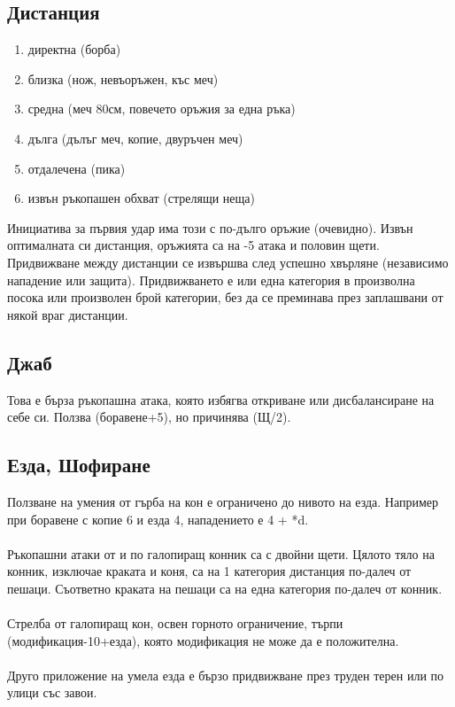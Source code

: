 \begin{footnotesize}
\subsection{Дистанция}
\begin{enumerate}
\item{директна (борба)}
\item{близка (нож, невъоръжен, къс меч)}
\item{средна (меч 80см, повечето оръжия за една ръка)}
\item{дълга (дълъг меч, копие, двуръчен меч)}
\item{отдалечена (пика)}
\item{извън ръкопашен обхват (стрелящи неща)}
\end{enumerate}
Инициатива за първия удар има този с по-дълго оръжие (очевидно).
Извън оптималната си дистанция, оръжията са на -5 атака и половин щети.
Придвижване между дистанции се извършва след успешно хвърляне (независимо нападение или защита).
Придвижването е или една категория в произволна посока или произволен брой категории, без да се преминава през заплашвани от някой враг дистанции.
\\


\subsection{Джаб}
Това е бърза ръкопашна атака, която избягва откриване или дисбалансиране на себе си.
Ползва (боравене+5), но причинява (Щ/2).


\subsection{Езда, Шофиране}
Ползване на умения от гърба на кон е ограничено до нивото на езда.
Например при боравене с копие 6 и езда 4, нападението е 4 + *d.
\\
\\
Ръкопашни атаки от и по галопиращ конник са с двойни щети.
Цялото тяло на конник, изключае краката и коня, са на 1 категория дистанция по-далеч от пешаци.
Съответно краката на пешаци са на една категория по-далеч от конник.
\\
\\
Стрелба от галопиращ кон, освен горното ограничение, търпи (модификация-10+езда), която модификация не може да е положителна.
\\
\\
Друго приложение на умела езда е бързо придвижване през труден терен или по улици със завои.



\end{footnotesize}
